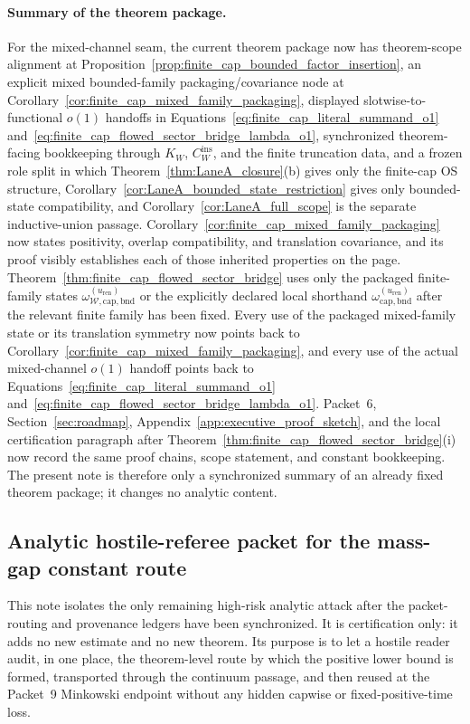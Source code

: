 \paragraph{Summary of the theorem package.}
For the mixed-channel seam, the current theorem package now has theorem-scope alignment at Proposition~\ref{prop:finite_cap_bounded_factor_insertion}, an explicit mixed bounded-family packaging/covariance node at Corollary~\ref{cor:finite_cap_mixed_family_packaging}, displayed slotwise-to-functional $o(1)$ handoffs in Equations~\eqref{eq:finite_cap_literal_summand_o1} and~\eqref{eq:finite_cap_flowed_sector_bridge_lambda_o1}, synchronized theorem-facing bookkeeping through $K_W$, $C_W^{\mathrm{ins}}$, and the finite truncation data, and a frozen role split in which Theorem~\ref{thm:LaneA_closure}(b) gives only the finite-cap OS structure, Corollary~\ref{cor:LaneA_bounded_state_restriction} gives only bounded-state compatibility, and Corollary~\ref{cor:LaneA_full_scope} is the separate inductive-union passage.
Corollary~\ref{cor:finite_cap_mixed_family_packaging} now states positivity, overlap compatibility, and translation covariance, and its proof visibly establishes each of those inherited properties on the page.
Theorem~\ref{thm:finite_cap_flowed_sector_bridge} uses only the packaged finite-family states $\omega_{\mathcal W,\mathrm{cap,bnd}}^{(u_{\mathrm{ren}})}$ or the explicitly declared local shorthand $\omega_{\mathrm{cap,bnd}}^{(u_{\mathrm{ren}})}$ after the relevant finite family has been fixed.
Every use of the packaged mixed-family state or its translation symmetry now points back to Corollary~\ref{cor:finite_cap_mixed_family_packaging}, and every use of the actual mixed-channel $o(1)$ handoff points back to Equations~\eqref{eq:finite_cap_literal_summand_o1} and~\eqref{eq:finite_cap_flowed_sector_bridge_lambda_o1}.
Packet~6, Section~\ref{sec:roadmap}, Appendix~\ref{app:executive_proof_sketch}, and the local certification paragraph after Theorem~\ref{thm:finite_cap_flowed_sector_bridge}(i) now record the same proof chains, scope statement, and constant bookkeeping.
The present note is therefore only a synchronized summary of an already fixed theorem package; it changes no analytic content.


\subsection{Analytic hostile-referee packet for the mass-gap constant route}
\label{subsec:analytic_gap_packet}

This note isolates the only remaining high-risk analytic attack after the packet-routing and provenance ledgers have been synchronized.
It is certification only: it adds no new estimate and no new theorem.
Its purpose is to let a hostile reader audit, in one place, the theorem-level route by which the positive lower bound is formed, transported through the continuum passage, and then reused at the Packet~9 Minkowski endpoint without any hidden capwise or fixed-positive-time loss.

